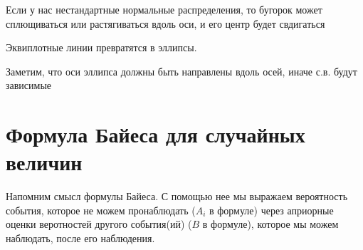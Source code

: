 \documentclass[12pt]{article}
\begin{document}
Если у нас нестандартные нормальные распределения, то бугорок может сплющиваться или растягиваться вдоль оси, и его центр будет свдигаться 

\begin{center}
\end{center}

Эквиплотные линии превратятся в эллипсы.

\begin{center}
\end{center}

Заметим, что оси эллипса должны быть направлены вдоль осей, иначе с.в. будут зависимые

\section{Формула Байеса для случайных величин}

Напомним смысл формулы Байеса. С помощью нее мы выражаем вероятность события, которое не можем пронаблюдать ($A_i$ в формуле) через априорные оценки веротностей другого события(ий) ($B$ в формуле), которое мы можем наблюдать, после его наблюдения.
\end{document}

